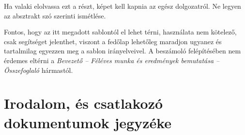 \documentclass[a4paper,oneside]{article}
\begin{document}
Ha valaki elolvassa ezt a részt, képet kell kapnia az egész
dolgozatról.  Ne legyen az absztrakt szó szerinti ismétlése.

Fontos, hogy az itt megadott sablontól el lehet térni, használata nem
kötelező, csak segítséget jelenthet, viszont a fedőlap lehetőleg
maradjon ugyanez és tartalmilag egyezzen meg a sablon irányelveivel. A
beszámoló felépítésében nem érdemes eltérni a \emph{Bevezető --
  Féléves munka és eredmények bemutatása -- Összefoglaló} hármastól.

\newpage

\section{Irodalom, és csatlakozó dokumentumok jegyzéke}
\label{sec:irod-es-csatl}
\end{document}
